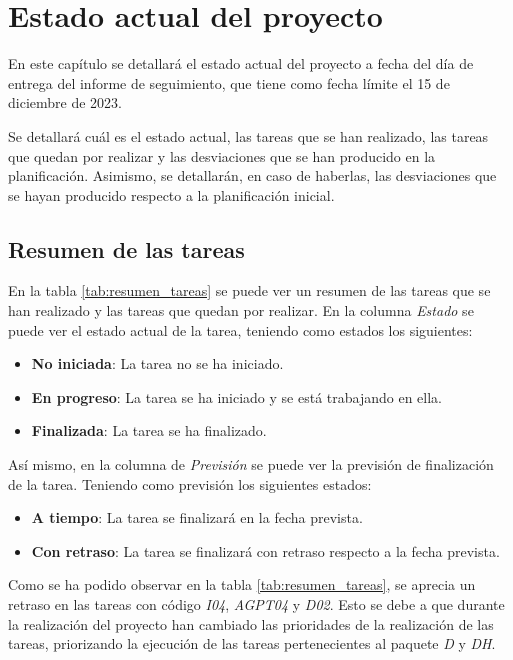 \chapter{Estado actual del proyecto}
\label{cap:estado_actual}


En este capítulo se detallará el estado actual del proyecto a fecha del día
de entrega del informe de seguimiento, que tiene como fecha límite el 15 de
diciembre de 2023.

Se detallará cuál es el estado actual, las tareas que se han realizado, las tareas
que quedan por realizar y las desviaciones que se han producido en la planificación.
Asimismo, se detallarán, en caso de haberlas, las desviaciones que se hayan
producido respecto a la planificación inicial.

\section{Resumen de las tareas}
\label{sec:resumen_tareas}


En la tabla \ref{tab:resumen_tareas} se puede ver un resumen de las tareas que se han realizado
y las tareas que quedan por realizar. En la columna \textit{Estado} se puede ver el estado actual
de la tarea, teniendo como estados los siguientes:

\begin{itemize}
    \item \textbf{No iniciada}: La tarea no se ha iniciado.
    \item \textbf{En progreso}: La tarea se ha iniciado y se está trabajando en ella.
    \item \textbf{Finalizada}: La tarea se ha finalizado.
\end{itemize}

Así mismo, en la columna de \textit{Previsión} se puede ver la previsión de finalización de la tarea.
Teniendo como previsión los siguientes estados:

\begin{itemize}
    \item \textbf{A tiempo}: La tarea se finalizará en la fecha prevista.
    \item \textbf{Con retraso}: La tarea se finalizará con retraso respecto a la fecha prevista.
\end{itemize}

Como se ha podido observar en la tabla \ref{tab:resumen_tareas}, se aprecia un
retraso en las tareas con código \textit{I04}, \textit{AGPT04} y \textit{D02}.
Esto se debe a que durante la realización del proyecto han cambiado las prioridades
de la realización de las tareas, priorizando la ejecución de las tareas pertenecientes
al paquete \textit{D} y \textit{DH}.

